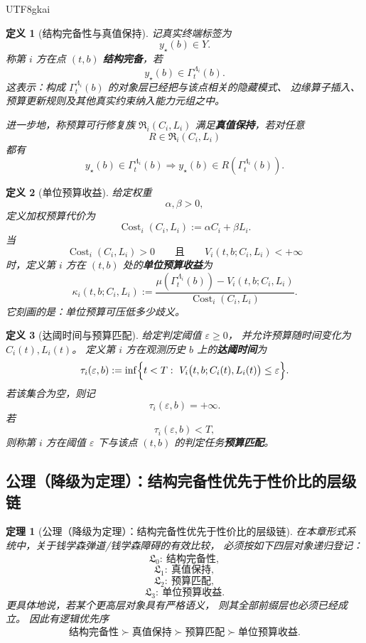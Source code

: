 \documentclass[12pt]{article}
\newtheorem{definition}{定义}[section]
\newtheorem{theorem}{定理}[section]
\begin{document}
\begin{CJK*}{UTF8}{gkai}
\begin{definition}[结构完备性与真值保持]
\label{def:tex1-ch3-structure}
记真实终端标签为
\[
  y_\star(b)\in Y.
\]
称第 $i$ 方在点 $(t,b)$ \textbf{结构完备}，若
\[
  y_\star(b)\in \Gamma_t^{\Lambda_i}(b).
\]
这表示：构成 $\Gamma_t^{\Lambda_i}(b)$ 的对象层已经把与该点相关的隐藏模式、
边缘算子插入、预算更新规则及其他真实约束纳入能力元组之中。

进一步地，称预算可行修复族 $\mathfrak R_i(C_i,L_i)$ 满足\textbf{真值保持}，若对任意
\[
  R\in \mathfrak R_i(C_i,L_i)
\]
都有
\[
  y_\star(b)\in \Gamma_t^{\Lambda_i}(b)
  \Rightarrow
  y_\star(b)\in R(\Gamma_t^{\Lambda_i}(b)).
\]
\end{definition}

\begin{definition}[单位预算收益]
\label{def:tex1-ch3-kappa}
给定权重
\[
  \alpha,\beta>0,
\]
定义加权预算代价为
\[
  \operatorname{Cost}_i(C_i,L_i):=\alpha C_i+\beta L_i.
\]
当
\[
  \operatorname{Cost}_i(C_i,L_i)>0
  \qquad\text{且}\qquad
  V_i(t,b;C_i,L_i)<+\infty
\]
时，定义第 $i$ 方在 $(t,b)$ 处的\textbf{单位预算收益}为
\[
  \kappa_i(t,b;C_i,L_i)
  :=
  \frac{
    \mu(\Gamma_t^{\Lambda_i}(b))
    -
    V_i(t,b;C_i,L_i)
  }{
    \operatorname{Cost}_i(C_i,L_i)
  }.
\]
它刻画的是：单位预算可压低多少歧义。
\end{definition}

\begin{definition}[达阈时间与预算匹配]
\label{def:tex1-ch3-threshold}
给定判定阈值 $\varepsilon\ge 0$，
并允许预算随时间变化为 $C_i(t),L_i(t)$。
定义第 $i$ 方在观测历史 $b$ 上的\textbf{达阈时间}为
\[
  \tau_i(\varepsilon,b)
  :=
  \inf
  \Bigl\{
    t<T:\ V_i\bigl(t,b;C_i(t),L_i(t)\bigr)\le \varepsilon
  \Bigr\}.
\]
若该集合为空，则记
\[
  \tau_i(\varepsilon,b)=+\infty.
\]
若
\[
  \tau_i(\varepsilon,b)<T,
\]
则称第 $i$ 方在阈值 $\varepsilon$ 下与该点 $(t,b)$ 的判定任务\textbf{预算匹配}。
\end{definition}

\subsection{公理（降级为定理）：结构完备性优先于性价比的层级链}
\label{subsec:tex1-ch3-axiom}

\begin{theorem}[公理（降级为定理）：结构完备性优先于性价比的层级链]
\label{thm:tex1-ch3-priority}
在本章形式系统中，关于钱学森弹道/钱学森障碍的有效比较，
必须按如下四层对象递归登记：
\[
  \mathfrak L_0:\ \text{结构完备性},
\]
\[
  \mathfrak L_1:\ \text{真值保持},
\]
\[
  \mathfrak L_2:\ \text{预算匹配},
\]
\[
  \mathfrak L_3:\ \text{单位预算收益}.
\]
更具体地说，若某个更高层对象具有严格语义，
则其全部前缀层也必须已经成立。
因此有逻辑优先序
\[
  \text{结构完备性}
  \succ
  \text{真值保持}
  \succ
  \text{预算匹配}
  \succ
  \text{单位预算收益}.
\]
\end{theorem}


\end{CJK*}
\end{document}
